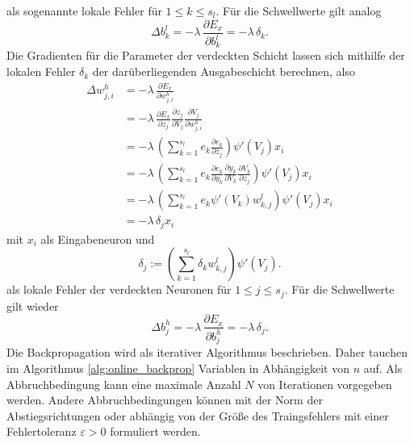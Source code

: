 als sogenannte lokale Fehler für $1 \leq k \leq s_l$.
Für die Schwellwerte gilt analog
\begin{equation*}
    \Delta b_k^l = -\lambda \, \frac{\partial E_x}{\partial b_{k}^l} 
                 = -\lambda \, \delta_k.
\end{equation*}
Die Gradienten für die Parameter der verdeckten Schicht lassen sich mithilfe der lokalen Fehler $\delta_k$ der darüberliegenden Ausgabeschicht berechnen, also
\begin{align*}
    \Delta w_{j,i}^h &= -\lambda\,\frac{\partial E_x}{\partial w_{j,i}^h} \\
                     &= -\lambda\,\frac{\partial E_x}{\partial z_{j}}
                            \frac{\partial z_j}{\partial V_j} 
                            \frac{\partial V_j}{\partial w_{j,i}^h} \\
                    &= -\lambda \,\left( \sum_{k=1}^{s_l} e_k \frac{\partial e_k}{\partial z_j}\right) \psi'(V_j) x_i \\
                    &= -\lambda \,\left( \sum_{k=1}^{s_l} e_k \frac{\partial e_k}{\partial y_k} \frac{\partial y_k}{\partial V_k} \frac{\partial V_k}{\partial z_j}\right) \psi'(V_j) x_i \\
                    &= -\lambda \,\left( \sum_{k=1}^{s_l} e_k \psi'(V_k) w_{k,j}^l \right) \psi'(V_j) x_i \\
                    &= -\lambda \, \delta_j x_i
\end{align*}
mit $x_i$ als Eingabeneuron und
\begin{equation*}
    \label{eq:delta_hidden}
    \delta_j:= \left(\sum_{k=1}^{s_l} \delta_k w_{k,j}^l\right) \psi'(V_j).
\end{equation*}
als lokale Fehler der verdeckten Neuronen für $1 \leq j \leq s_j$.
Für die Schwellwerte gilt wieder
\begin{equation*}
    \Delta b_j^h = -\lambda \, \frac{\partial E_x}{\partial b_{j}^h} 
                 = -\lambda \, \delta_j.
\end{equation*}
Die Backpropagation wird als iterativer Algorithmus beschrieben. Daher tauchen im Algorithmus \ref{alg:online_backprop} Variablen in Abhängigkeit von $n$ auf. Als Abbruchbedingung kann eine maximale Anzahl $N$ von Iterationen vorgegeben werden. Andere Abbruchbedingungen können mit der Norm der Abstiegsrichtungen oder abhängig von der Größe des Traingsfehlers mit einer Fehlertoleranz $\varepsilon >0$ formuliert werden.

